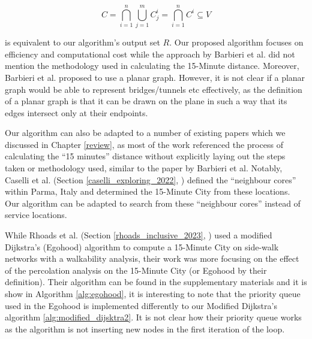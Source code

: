 $$C=\bigcap\limits_{i=1}^n\bigcup\limits_{j=1}^m C^i_j=\bigcap\limits_{i=1}^n C^i\subseteq V$$

is equivalent to our algorithm's output set $R$. Our proposed algorithm focuses on efficiency and computational cost while the approach by Barbieri et al. did not mention the methodology used in calculating the 15-Minute distance. Moreover, Barbieri et al. proposed to use a planar graph. However, it is not clear if a planar graph would be able to represent bridges/tunnels etc effectively, as the definition of a planar graph is that it can be drawn on the plane in such a way that its edges intersect only at their endpoints.

Our algorithm can also be adapted to a number of existing papers which we discussed in Chapter \ref{review}, as most of the work referenced the process of calculating the ``15 minutes'' distance without explicitly laying out the steps taken or methodology used, similar to the paper by Barbieri et al. Notably, Caselli et al. (Section \ref{caselli_exploring_2022}, \cite{caselli_exploring_2022}) defined the ``neighbour cores'' within Parma, Italy and determined the 15-Minute City from these locations. Our algorithm can be adapted to search from these ``neighbour cores'' instead of service locations. 

While Rhoads et al. (Section \ref{rhoads_inclusive_2023}, \cite{rhoads_inclusive_2023}) used a modified Dijkstra's (Egohood) algorithm to compute a 15-Minute City on side-walk networks with a walkability analysis, their work was more focusing on the effect of the percolation analysis on the 15-Minute City (or Egohood by their definition). Their algorithm can be found in the supplementary materials and it is show in Algorithm \ref{alg:egohood}, it is interesting to note that the priority queue used in the Egohood is implemented differently to our Modified Dijkstra's algorithm \ref{alg:modified_dijsktra2}. It is not clear how their priority queue works as the algorithm is not inserting new nodes in the first iteration of the loop.

